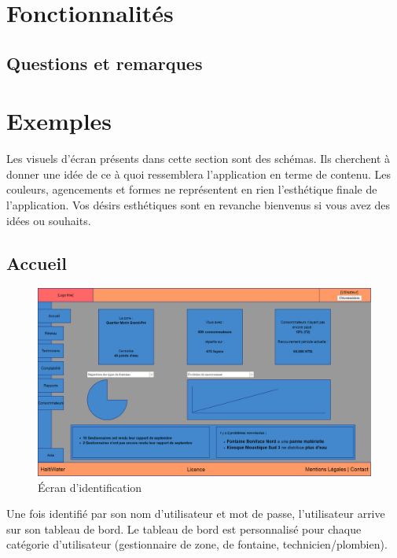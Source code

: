 \documentclass[a4paper, 11pt]{article}
\begin{document}
\section{Fonctionnalités}

  \subsection{Questions et remarques}
\section{Exemples}
  \begin{shaded}
    Les visuels d'écran présents dans cette section sont des schémas. Ils cherchent à donner une idée de ce à quoi ressemblera l'application en terme de contenu. Les couleurs, agencements et formes ne représentent en rien l'esthétique finale de l'application. Vos désirs esthétiques sont en revanche bienvenus si vous avez des idées ou souhaits.
  \end{shaded}

  \subsection{Accueil}

    \begin{figure}[H]
        \includegraphics[width=\textwidth]{Cahier_des_Charges/accueil}
        \caption{\'Ecran d'identification}
        \label{fig:zone_dashboard}
    \end{figure}

    Une fois identifié par son nom d'utilisateur et mot de passe, l'utilisateur arrive sur son tableau de bord. Le tableau de bord est personnalisé pour chaque catégorie d'utilisateur (gestionnaire de zone, de fontaine, technicien/plombien).
\end{document}
